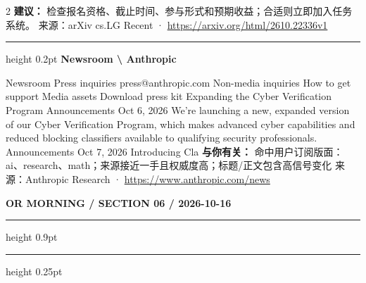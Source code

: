 \documentclass[10.5pt]{ctexart}
\begin{document}
\begin{multicols}{2}
\textbf{建议：} 检查报名资格、截止时间、参与形式和预期收益；合适则立即加入任务系统。
{\footnotesize\color{ormuted} 来源：arXiv cs.LG Recent · \url{https://arxiv.org/html/2610.22336v1}}
\vspace{2mm}
\hrule height 0.2pt
\vspace{2mm}
{\large\bfseries Newsroom \textbackslash{} Anthropic}\par
Newsroom Press inquiries press@anthropic.com Non-media inquiries How to get support Media assets Download press kit Expanding the Cyber Verification Program Announcements Oct 6, 2026 We’re launching a new, expanded version of our Cyber Verification Program, which makes advanced cyber capabilities and reduced blocking classifiers available to qualifying security professionals. Announcements Oct 7, 2026 Introducing Cla
\textbf{与你有关：} 命中用户订阅版面：ai、research、math；来源接近一手且权威度高；标题/正文包含高信号变化
{\footnotesize\color{ormuted} 来源：Anthropic Research · \url{https://www.anthropic.com/news}}
\end{multicols}
\newpage
{\small\bfseries OR MORNING / SECTION 06 / 2026-10-16}
\vspace{2mm}
\hrule height 0.9pt
\vspace{1.5mm}
\hrule height 0.25pt
\vspace{4mm}
\end{document}

